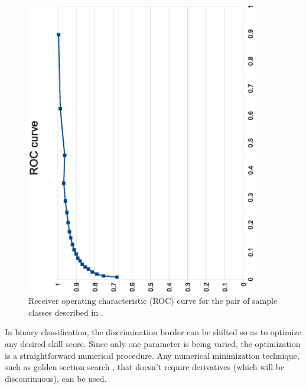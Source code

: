 \documentclass{article}
\begin{document}
\begin{figure}
\includegraphics[width=0.9\textwidth,angle=-90]{sample_roc.eps}
Receiver operating characteristic (ROC) curve
for the pair of sample classes described in \citet{Mills2011}.
\label{sample_roc}
\end{figure}

In binary classification, the discrimination border can be shifted so as to
optimize any desired skill score.  Since only one parameter is being varied,
the optimization is a straightforward numerical procedure.  Any numerical
minimization technique, such as golden section search \citep{Press_etal1992},
that doesn't require derivatives (which will be discontinuous), can be used.
\end{document}

